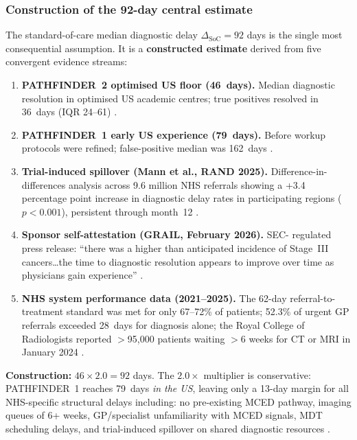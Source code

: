 \documentclass[11pt,letter]{article}
\begin{document}
\subsubsection{Construction of the 92-day central estimate}

The standard-of-care median diagnostic delay $\Delta_{\text{SoC}} = 92$
days is the single most consequential assumption. It is a
\textbf{constructed estimate} derived from five convergent evidence streams:

\begin{enumerate}[label=(\roman*), nosep]
\item \textbf{PATHFINDER~2 optimised US floor (46~days).} Median diagnostic
  resolution in optimised US academic centres; true positives resolved in
  36~days (IQR 24--61) \cite{Nabavizadeh2025}.

\item \textbf{PATHFINDER~1 early US experience (79~days).} Before workup
  protocols were refined; false-positive median was 162~days
  \cite{Schrag2023}.

\item \textbf{Trial-induced spillover (Mann et al., RAND 2025).}
  Difference-in-differences analysis across 9.6 million NHS referrals
  showing a +3.4 percentage point increase in diagnostic delay rates in
  participating regions ($p < 0.001$), persistent through month~12
  \cite{Mann2025}.

\item \textbf{Sponsor self-attestation (GRAIL, February 2026).} SEC-
  regulated press release: ``there was a higher than anticipated incidence
  of Stage~III cancers\ldots the time to diagnostic resolution appears to
  improve over time as physicians gain experience'' \cite{GRAIL2026}.

\item \textbf{NHS system performance data (2021--2025).} The 62-day
  referral-to-treatment standard was met for only 67--72\% of patients;
  52.3\% of urgent GP referrals exceeded 28~days for diagnosis alone;
  the Royal College of Radiologists reported $>$95,000 patients waiting
  $>$6 weeks for CT or MRI in January 2024 \cite{NHS2025}.
\end{enumerate}

\noindent\textbf{Construction:} $46 \times 2.0 = 92$ days. The
$2.0\times$ multiplier is conservative: PATHFINDER~1 reaches 79~days
\emph{in the US}, leaving only a 13-day margin for all NHS-specific
structural delays including: no pre-existing MCED pathway, imaging queues
of 6+ weeks, GP/specialist unfamiliarity with MCED signals, MDT scheduling
delays, and trial-induced spillover on shared diagnostic resources
\cite{Lowenhoff2025}.
\end{document}
